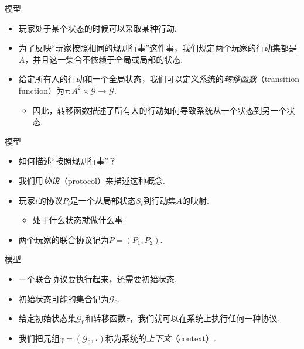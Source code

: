 \begin{frame}{模型}
\begin{itemize}
    \item 玩家处于某个状态的时候可以采取某种行动.
    \item 为了反映“玩家按照相同的规则行事”这件事，我们规定两个玩家的行动集都是$A$，并且这一集合不依赖于全局或局部的状态.
    \item 给定所有人的行动和一个全局状态，我们可以定义系统的\emph{转移函数}（transition function）为$\tau:A^2\times\mathcal G\to\mathcal G$.
    \begin{itemize}
        \item 因此，转移函数描述了所有人的行动如何导致系统从一个状态到另一个状态.
    \end{itemize}
\end{itemize}
\end{frame}

\begin{frame}{模型}
\begin{itemize}
    \item 如何描述“按照规则行事”？
    \item 我们用\emph{协议}（protocol）来描述这种概念.
    \item 玩家$i$的协议$P_i$是一个从局部状态$S_i$到行动集$A$的映射.
    \begin{itemize}
        \item 处于什么状态就做什么事.
    \end{itemize}
    \item 两个玩家的联合协议记为$P=(P_1,P_2)$.
\end{itemize}
\end{frame}

\begin{frame}{模型}
\begin{itemize}
    \item 一个联合协议要执行起来，还需要初始状态.
    \item 初始状态可能的集合记为$\mathcal G_0$.
    \item 给定初始状态集$\mathcal G_0$和转移函数$\tau$，我们就可以在系统上执行任何一种协议.
    \item 我们把元组$\gamma=(\mathcal G_0,\tau)$称为系统的\emph{上下文}（context）.
\end{itemize}
\end{frame}


